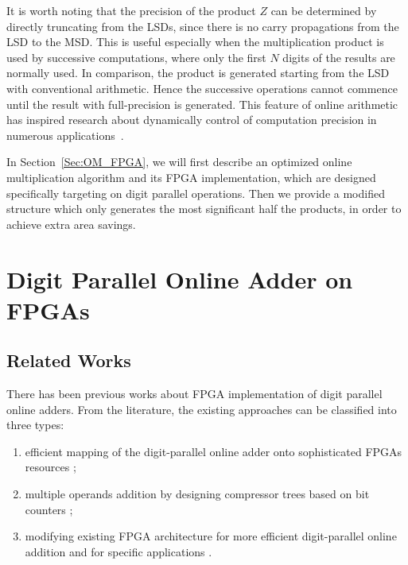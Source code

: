 \documentclass[conference]{IEEEtran}
\begin{document}
It is worth noting that the precision of the product $Z$ can be determined by directly truncating from the LSDs, since there is no carry propagations from the LSD to the MSD. This is useful especially when the multiplication product is used by successive computations, where only the first $N$ digits of the results are normally used. In comparison, the product is generated starting from the LSD with conventional arithmetic. Hence the successive operations cannot commence until the result with full-precision is generated. This feature of online arithmetic has inspired research about dynamically control of computation precision in numerous applications~\cite{Online_Truncation}.


In Section~\ref{Sec:OM_FPGA}, we will first describe an optimized online multiplication algorithm and its FPGA implementation, which are designed specifically targeting on digit parallel operations. Then we provide a modified structure which only generates the most significant half the products, in order to achieve extra area savings.



\section{Digit Parallel Online Adder on FPGAs}\label{Sec:OA_FPGA}
\subsection{Related Works}
There has been previous works about FPGA implementation of digit parallel online adders. From the literature, the existing approaches can be classified into three types:

\begin{enumerate}
    \item efficient mapping of the digit-parallel online adder onto sophisticated FPGAs resources \cite{FPT09RA,ASAP09RA};
    \item multiple operands addition by designing compressor trees based on bit counters \cite{TC13RA,ASPDAC10RA_FPGA};
    \item modifying existing FPGA architecture for more efficient digit-parallel online addition \cite{DAC07_CounterTree} and for specific applications \cite{FPL09_onlineCCM}.
\end{enumerate}
\end{document}
